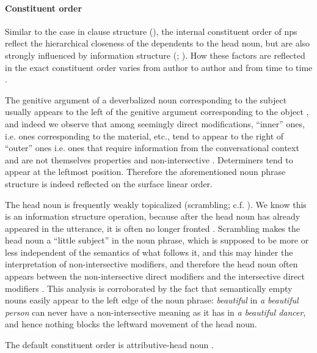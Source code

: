 \documentclass[a4paper, oneside, 12pt]{report}
\newcommand*{\citesec}[1]{\S~{#1}}
\newcommand*{\citepage}[1]{p.~{#1}}
\newcommand*{\citepages}[1]{pp.~{#1}}
\newcommand{\form}[1]{\emph{#1}}
\begin{document}
\paragraph*{Constituent order}
Similar to the case in clause structure (),
the internal constituent order of \acs{np}s reflect
the hierarchical closeness of the dependents to the head noun,
but are also strongly influenced by information structure
(\citealt[\citesec{11.75}]{Pinkster1}; \citealt[\citepage{484}]{devine2006latin}).
How these factors are reflected in the exact constituent order
varies from author to author and from time to time \citep[\citepage{484}]{devine2006latin}.

The genitive argument of a deverbalized noun corresponding to the subject 
usually appears to the left of the genitive argument corresponding to the object
\citep[\citepage{316}]{devine2006latin},
and indeed we observe that among seemingly direct modifications,
``inner'' ones, i.e. ones corresponding to the material, etc.,
tend to appear to the right of ``outer'' ones 
i.e. ones that require information from the conversational context 
and are not themselves properties and non-intersective
\citep[\citepages{481-482}]{devine2006latin}.
Determiners tend to appear at the leftmost position.
Therefore the aforementioned noun phrase structure is indeed reflected on the surface linear order.

The head noun is frequently weakly topicalized 
(scrambling; c.f. ).
We know this is an information structure operation,
because after the head noun has already appeared in the utterance,
it is often no longer fronted \citep[\citepage{484}]{devine2006latin}.
Scrambling makes the head noun a ``little subject'' in the noun phrase,
which is supposed to be more or less independent 
of the semantics of what follows it,
and this may hinder the interpretation of non-intersective modifiers,
and therefore the head noun often appears between
the non-intersective direct modifiers and the intersective direct modifiers
\citep[\citepage{485}]{devine2006latin}.
This analysis is corroborated by the fact that 
semantically empty nouns easily appear to the left edge of the noun phrase:
\form{beautiful} in \form{a beautiful person}
can never have a non-intersective meaning as it has in \form{a beautiful dancer},
and hence nothing blocks the leftward movement of the head noun.

The default constituent order is attributive-head noun
\citep[\citepage{396}]{allen1903allen}.
\end{document}

